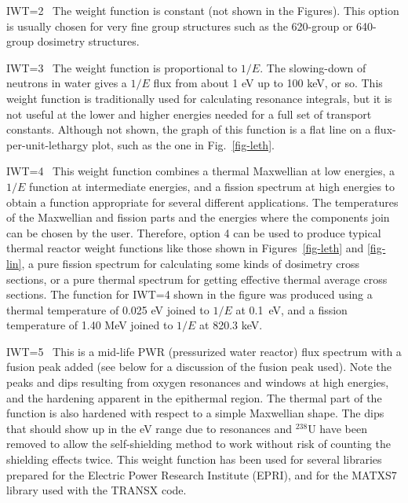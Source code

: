 \begin{description}
\begin{singlespace}
\item{IWT=2\ } The weight function is constant (not shown in the Figures).
   This option is usually chosen for very fine group
   structures such as the 620-group or 640-group
   dosimetry structures.

\item{IWT=3\ } The weight function is proportional to $1/E$.
   The slowing-down of neutrons in water gives a $1/E$
   flux from about 1 eV up to 100 keV, or so.  This
   weight function is traditionally used for
   calculating resonance integrals, but it is not
   useful at the lower and higher energies needed for a
   full set of transport constants.  Although not shown, the graph
   of this function is a flat line on a flux-per-unit-lethargy
   plot, such as the one in Fig.~\ref{fig-leth}.

\item{IWT=4\ } This weight function combines a thermal Maxwellian at low
   energies, a $1/E$ function at intermediate energies, and a
   fission spectrum at high energies to obtain a function appropriate
   for several different applications.  The temperatures of the
   Maxwellian and fission parts and the energies where the components
   join can be chosen by the user.  Therefore, option 4 can be used
   to produce typical thermal reactor weight functions like those
   shown in Figures~\ref{fig-leth} and \ref{fig-lin}, a pure fission
   spectrum for calculating some kinds of dosimetry cross sections, or a
   pure thermal spectrum for getting effective thermal average cross
   sections.  The function  for IWT=4 shown in the figure was produced
   using a thermal temperature of 0.025 eV joined to $1/E$ at 0.1~eV,
   and a fission temperature of 1.40 MeV joined to $1/E$ at 820.3 keV.

\item{IWT=5\ } This is a mid-life PWR (pressurized water reactor) flux
   spectrum with a fusion peak added (see below for a discussion of the
   fusion peak used).  Note the peaks and dips resulting from oxygen
   resonances and windows at high energies, and the hardening apparent
   in the epithermal region.  The thermal part of the function is also
   hardened with respect to a simple Maxwellian shape.  The dips that
   should show up in the eV range due to resonances and $^{238}$U have been
   removed to allow the self-shielding method to work without risk of
   counting the shielding effects twice.  This weight function has
   been used for several libraries\cite{powr} prepared for the Electric
   Power Research Institute (EPRI), and for the MATXS7 library
   used with the TRANSX code.


\end{singlespace}
\end{description}
